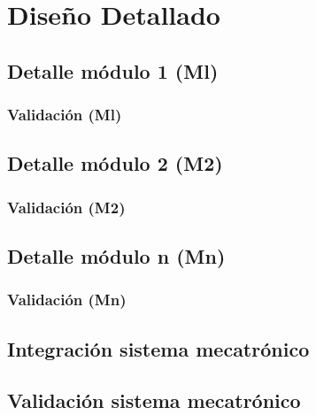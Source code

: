 
\section{Diseño Detallado}

\subsection{Detalle módulo 1 (M{l})}

\subsubsection{Validación (M{l})}

\subsection{Detalle módulo 2 (M{2})}

\subsubsection{Validación (M{2})}


\subsection{Detalle módulo n (M{n})}

\subsubsection{Validación (M{n})}

\subsection{Integración sistema mecatrónico}

\subsection{Validación sistema mecatrónico}



\endinput 